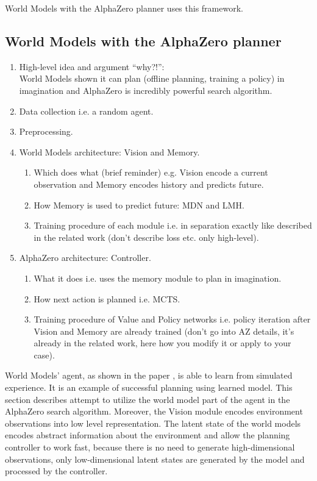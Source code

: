 World Models with the AlphaZero planner uses this framework.

\subsection{World Models with the AlphaZero planner}

\begin{enumerate}
\item High-level idea and argument ``why?!'':\\
  World Models shown it can plan (offline planning, training a policy) in imagination and AlphaZero is incredibly powerful search algorithm.
\item Data collection i.e. a random agent.
\item Preprocessing.
\item World Models architecture: Vision and Memory.
  \begin{enumerate}
  \item Which does what (brief reminder) e.g. Vision encode a current observation and Memory encodes history and predicts future.
  \item How Memory is used to predict future: MDN and LMH.
  \item Training procedure of each module i.e. in separation exactly like described in the related work (don't describe loss etc. only high-level).
  \end{enumerate}
\item AlphaZero architecture: Controller.
  \begin{enumerate}
  \item What it does i.e. uses the memory module to plan in imagination.
  \item How next action is planned i.e. MCTS.
  \item Training procedure of Value and Policy networks i.e. policy iteration after Vision and Memory are already trained (don't go into AZ details, it's already in the related work, here how you modify it or apply to your case).
  \end{enumerate}
\end{enumerate}

World Models' agent, as shown in the paper \cite{Algo.WorldModels}, is able to learn from simulated experience. It is an example of successful planning using learned model. This section describes attempt to utilize the world model part of the agent in the AlphaZero search algorithm. Moreover, the Vision module encodes environment observations into low level representation. The latent state of the world models encodes abstract information about the environment and allow the planning controller to work fast, because there is no need to generate high-dimensional observations, only low-dimensional latent states are generated by the model and processed by the controller.

